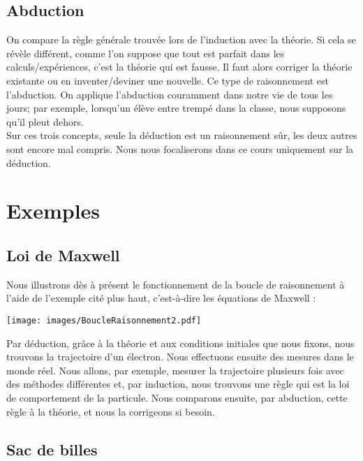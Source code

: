 \subsection{Abduction}

On compare la règle générale trouvée lors de l'induction avec la théorie. Si cela se révèle différent, comme l'on suppose que tout est parfait dans les calculs/expériences, c'est la théorie qui est fausse. Il faut alors corriger la théorie existante ou en inventer/deviner une nouvelle. Ce type de raisonnement est l'abduction. On applique l'abduction couramment dans notre vie de tous les jours; par exemple, lorsqu'un élève entre trempé dans la classe, nous supposons qu'il pleut dehors. \\


Sur ces trois concepts, seule la déduction est un raisonnement sûr, les deux autres sont encore mal compris. Nous nous focaliserons dans ce cours uniquement sur la déduction. \\


\section{Exemples}

\subsection{Loi de Maxwell}

Nous illustrons dès à présent le fonctionnement de la boucle de raisonnement à l'aide de l'exemple cité plus haut, c'est-à-dire les équations de Maxwell :

\begin{center}
\texttt{[image: images/BoucleRaisonnement2.pdf]}
\end{center}

Par déduction, grâce à la théorie et aux conditions initiales que nous fixons, nous trouvons la trajectoire d'un électron. Nous effectuons ensuite des mesures dans le monde réel. Nous allons, par exemple, mesurer la trajectoire plusieurs fois avec des méthodes différentes et, par induction, nous trouvons une règle qui est la loi de comportement de la particule. Nous comparons ensuite, par abduction, cette règle à la théorie, et nous la corrigeons si besoin.\\



\subsection{Sac de billes}

